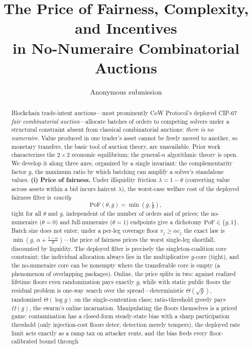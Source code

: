 \documentclass[11pt]{article}
\title{The Price of Fairness, Complexity, and Incentives\\
in No-Numeraire Combinatorial Auctions}
\author{Anonymous submission}
\date{}
\theoremstyle{remark}
\newcommand{\PoF}{\mathrm{PoF}}
\begin{document}
\maketitle

\begin{abstract}
Blockchain trade-intent auctions---most prominently CoW Protocol's deployed
CIP-67 \emph{fair combinatorial auction}---allocate batches of orders to
competing solvers under a structural constraint absent from classical
combinatorial auctions: \emph{there is no numeraire}. Value produced in one
trader's asset cannot be freely moved to another, so monetary transfers, the
basic tool of auction theory, are unavailable. Prior work characterizes the
$2\times 2$ economic equilibrium; the general-$n$ algorithmic theory is open.
We develop it along three axes, organized by a single invariant: the
complementarity factor $g$, the maximum ratio by which batching can amplify a
solver's standalone values. \textbf{(i) Price of fairness.} Under illiquidity
friction $\lambda=1-\theta$ (converting value across assets within a bid
incurs haircut $\lambda$), the worst-case welfare cost of the deployed
fairness filter is \emph{exactly}
\[
\PoF(\theta,g)=\min\!\left(g,\tfrac1\theta\right),
\]
tight for all $\theta$ and $g$, independent of the number of orders and of
prices; the no-numeraire ($\theta=0$) and full-numeraire ($\theta=1$)
endpoints give a dichotomy $\PoF\in\{g,1\}$. Batch size does not enter;
under a per-leg coverage floor $v_j\ge\alpha c_j$ the exact law is
$\min(g,\,\alpha+\frac{1-\alpha}{\theta})$---the price of fairness
prices the worst single-leg shortfall, discounted by liquidity. The
deployed filter is precisely the singleton-coalition core constraint; the
individual allocation always lies in the multiplicative $g$-core (tight),
and the no-numeraire core can be nonempty where the transferable core is
empty (a phenomenon of overlapping packages). Online, the price splits in two: against realized lifetime floors even
randomization pays exactly $g$, while with static public floors the
residual problem is one-way search over the spread---deterministic
$\Theta(\sqrt g)$, randomized $\Theta(\log g)$ on the single-contention
class; ratio-threshold greedy pays $\Omega(g)$, the swarm's online
incarnation. Manipulating the floors themselves is a priced game:
contamination has a closed-form steady-state bias with a sharp
participation threshold (only injection-cost floors deter; detection
merely tempers), the deployed rate limit acts exactly as a ramp tax on
attacker rents, and the bias feeds every floor-calibrated bound through

\end{abstract}
\end{document}
